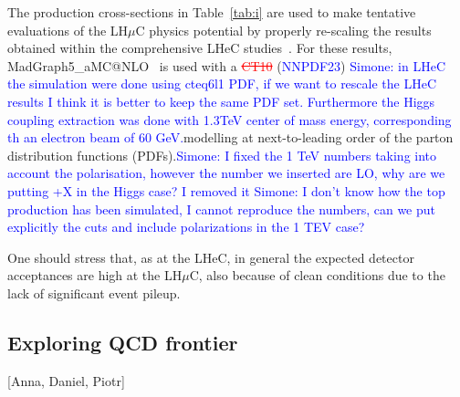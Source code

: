 \documentclass[a4paper,11pt]{article}
\makeatletter
\newcommand{\del}[1]{\textcolor{red}{\sout{#1}}}
\newcommand{\add}[1]{\textcolor{blue}{#1}}
\newcommand{\mgamcnlo}{MadGraph5\_aMC@NLO}
\newcommand{\lhuc}{LH\ensuremath{\mu}C\xspace}
\makeatother
\begin{document}
The production cross-sections in Table~\ref{tab:i} are used to make tentative evaluations of the \lhuc physics potential by properly re-scaling the results obtained within the comprehensive LHeC studies~\cite{LHeC:2020van,Ahmadova:2025vzd}.
For these results, \mgamcnlo~\cite{Alwall:2014hca} is used with a \del{CT10} (\add{NNPDF23}) \add{Simone: in LHeC the simulation were done using cteq6l1 PDF, if we want to rescale the LHeC results I think it is better to keep the same PDF set. Furthermore the Higgs coupling extraction was done with 1.3TeV center of mass energy, corresponding th an electron beam of 60 GeV.}modelling at next-to-leading order of the parton distribution functions (PDFs).\add{Simone: I fixed the 1 TeV numbers taking into account the polarisation, however the number we inserted are LO, why are we putting +X in the Higgs case? I removed it}
\add{Simone: I don't know how the top production has been simulated, I cannot reproduce the numbers, can we put explicitly the cuts and include polarizations in the 1 TEV case?}




One should stress that, as at the LHeC, in general the expected detector acceptances are high at the LH$\mu$C, also because of clean conditions due to the lack of significant event pileup.
\subsection{Exploring QCD frontier}

[Anna, Daniel, Piotr]\\
\end{document}
